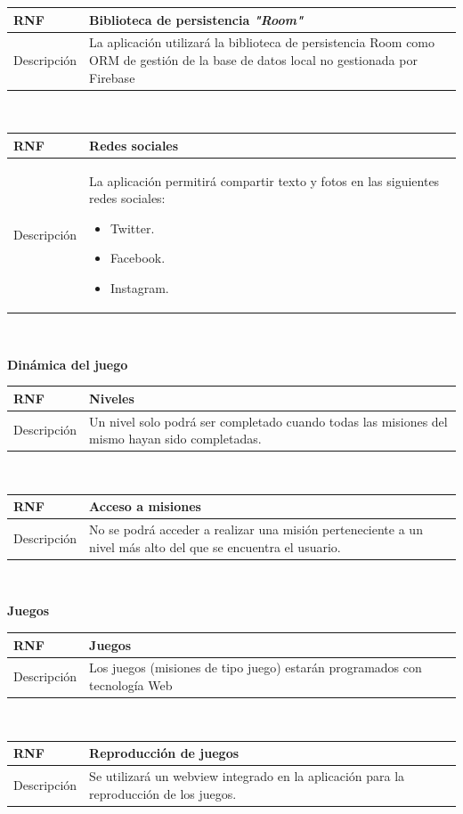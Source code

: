 \documentclass[twoside]{report}
\newcommand\addrow[2]{#1 &#2\\ }
\newcommand\addheading[2]{#1 &#2\\ \hline}
\newcommand\tabularhead{\begin{tabular}{lp{0.7\textwidth}}
\hline
}
\newenvironment{req}{\tabularhead}
{\hline\end{tabular}}
\begin{document}
\begin{req}
	\addheading{\textbf{RNF\arabic{nonFunctionalRequirements}}}{Biblioteca de persistencia \textit{"Room"}}
	\addrow{Descripción}{La aplicación utilizará la biblioteca de persistencia Room como ORM de gestión de la base de datos local no gestionada por Firebase}
\end{req}\\

\begin{req}
	\addheading{\textbf{RNF\arabic{nonFunctionalRequirements}}}{Redes sociales}
	\addrow{Descripción}{La aplicación permitirá compartir texto y fotos en las siguientes redes sociales:
	\begin{itemize}
	\item Twitter.
	\item Facebook.
	\item Instagram.
	\end{itemize}}
\end{req}\\

\textbf{Dinámica del juego}

\begin{req}
	\addheading{\textbf{RNF\arabic{nonFunctionalRequirements}}}{Niveles}
	\addrow{Descripción}{Un nivel solo podrá ser completado cuando todas las misiones del mismo hayan sido completadas.}
\end{req}\\

\begin{req}
	\addheading{\textbf{RNF\arabic{nonFunctionalRequirements}}}{Acceso a misiones}
	\addrow{Descripción}{No se podrá acceder a realizar una misión perteneciente a un nivel más alto del que se encuentra el usuario.}
\end{req}\\

\textbf{Juegos}\\

\begin{req}
	\addheading{\textbf{RNF\arabic{nonFunctionalRequirements}}}{Juegos}
	\addrow{Descripción}{Los juegos (misiones de tipo juego) estarán programados con tecnología Web}
\end{req}\\

\begin{req}
	\addheading{\textbf{RNF\arabic{nonFunctionalRequirements}}}{Reproducción de juegos}
	\addrow{Descripción}{Se utilizará un webview integrado en la aplicación para la reproducción de los juegos.}
\end{req}\\
\end{document}
